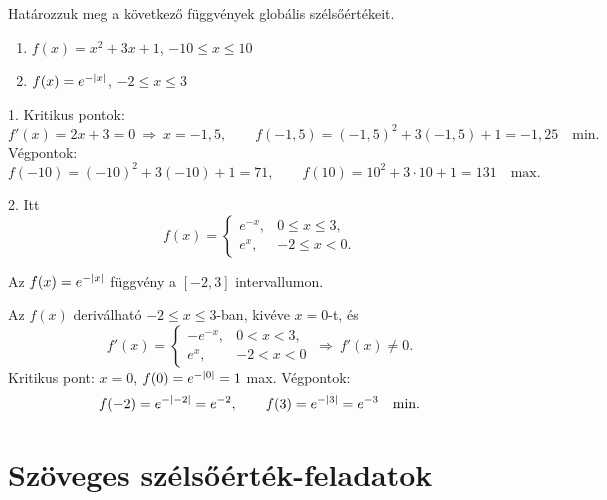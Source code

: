 \documentclass[11pt]{article}
\begin{document}
\begin{exbox}
\begin{example}
Határozzuk meg a következő függvények globális szélsőértékeit.
\begin{enumerate}[label=\arabic*., itemsep=2pt]
\item $f(x)=x^{2}+3x+1$, $-10\le x\le 10$
\item $f(x)=e^{-\left|x\right|}$, $-2\le x\le 3$
\end{enumerate}
\end{example}
\end{exbox}
\begin{solution}
1. Kritikus pontok:
\[
f'(x)=2x+3=0\ \Longrightarrow\ x=-1,5,\qquad f(-1,5)=(-1,5)^{2}+3(-1,5)+1=-1,25\quad\text{min.}
\]
Végpontok:
\[
f(-10)=(-10)^{2}+3(-10)+1=71,\qquad f(10)=10^{2}+3\cdot 10+1=131\quad\text{max.}
\]

2. Itt
\[
f(x)=\begin{cases} e^{-x}, & 0\le x\le 3,\\ e^{x}, & -2\le x<0 .\end{cases}
\]

\begin{notefig}{Az $f(x)=e^{-\left|x\right|}$ függvény a $[-2, 3]$ intervallumon.}
\end{notefig}

\noindent Az $f(x)$ deriválható $-2\le x\le 3$-ban, kivéve $x=0$-t, és
\[
f'(x)=\begin{cases} -e^{-x}, & 0<x<3,\\ e^{x}, & -2<x<0\end{cases}\ \Longrightarrow\ f'(x)\neq 0 .
\]
Kritikus pont: $x=0$, $f(0)=e^{-\left|0\right|}=1$ max. Végpontok:
\[
f(-2)=e^{-\left|-2\right|}=e^{-2},\qquad f(3)=e^{-\left|3\right|}=e^{-3}\quad\text{min.}
\]
\end{solution}

\section{Szöveges szélsőérték-feladatok}
\end{document}
